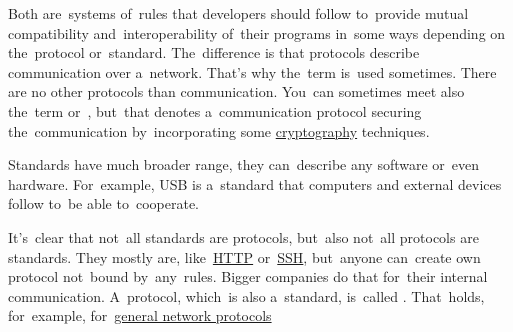 \label{protocolstandard}
Both are~systems of~rules that developers should follow to~provide mutual compatibility and~interoperability of~their programs in~some ways depending on the~protocol or~standard.
The~difference is that protocols describe communication over a~network.
That's why the~term  is~used sometimes.
There are no other protocols than communication.
You~can sometimes meet also the~term  or~, but~that denotes a~communication protocol securing the~communication by~incorporating some \hyperref[cryptography]{cryptography} techniques.

Standards have much broader range, they can~describe any software or~even hardware.
For~example, USB is a~standard that computers and external devices follow to~be able to~cooperate.

\warning It's~clear that not~all standards are protocols, but~also not~all protocols are standards.
They mostly are, like~\hyperref[http]{HTTP} or~\hyperref[ssh]{SSH}, but~anyone can~create own protocol not~bound by~any~rules.
Bigger companies do that for~their internal communication.
A~protocol, which~is also a~standard, is~called .
That~holds, for~example, for~\hyperref[networkprotocols]{general network protocols}
